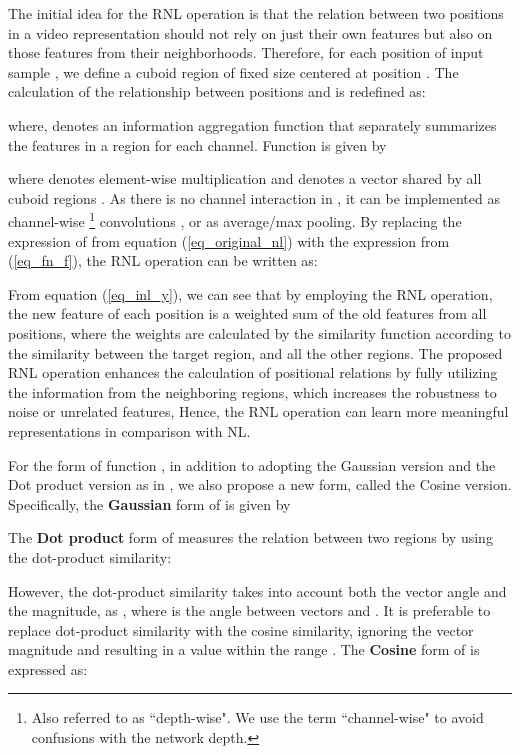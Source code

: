 \documentclass[a4paper,conference]{IEEEtran}
\begin{document}
The initial idea for the RNL operation is that the relation between two positions in a video representation should not rely on just their own features but also on those features from their neighborhoods. Therefore, for each position  of input sample , we define a cuboid region  of fixed size centered at position . The calculation of the relationship  between positions  and  is redefined as:

where,  denotes an information aggregation function that separately summarizes the features in a region for each channel. Function  is given by
\vspace*{-0.15cm}

where  denotes element-wise multiplication and  denotes a vector shared by all cuboid regions . As there is no channel interaction in , it can be implemented as channel-wise \footnote{Also referred to as “depth-wise". We use the term “channel-wise" to avoid confusions with the network depth.} convolutions \cite{sandler2018mobilenetv2}, or as average/max pooling. By replacing the expression of  from equation  (\ref{eq_original_nl}) with the expression from (\ref{eq_fn_f}), the RNL operation can be written as:


From equation (\ref{eq_inl_y}), we can see that by employing the RNL operation, the new feature of each position is a weighted sum of the old features from all positions, where the weights are calculated by the similarity function  according to the similarity between the target region, and all the other regions. The proposed RNL operation enhances the calculation of positional relations by fully utilizing the information from the neighboring regions, which increases the robustness to noise or unrelated features, Hence, the RNL operation can learn more meaningful representations in comparison with NL.

For the form of function , in addition to adopting the Gaussian version and the Dot product version as in \cite{wang2018non}, we also propose a new form, called the Cosine version. Specifically, the \textbf{Gaussian} form of  is given by



The \textbf{Dot product} form of  measures the relation between two regions by using the dot-product similarity:



However, the dot-product similarity takes into account both the vector angle and the magnitude, as  , where  is the angle between vectors  and . It is preferable to replace dot-product similarity with the cosine similarity, ignoring the vector magnitude and resulting in a value within the range . The \textbf{Cosine} form of  is expressed as:
\end{document}
